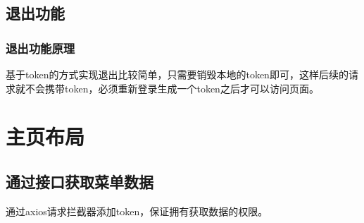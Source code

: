 \subsection{退出功能}
\subsubsection{退出功能原理}
基于token的方式实现退出比较简单，只需要销毁本地的token即可，这样后续的请求就不会携带token，必须重新登录生成一个token之后才可以访问页面。
\section{主页布局}
\subsection{通过接口获取菜单数据}

通过axios请求拦截器添加token，保证拥有获取数据的权限。